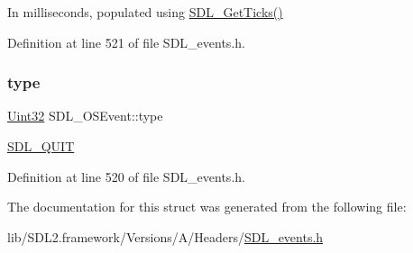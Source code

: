 In milliseconds, populated using \mbox{\hyperlink{_s_d_l__timer_8h_a0b9bc71d6287e0ffafdc3419760fe2b3}{S\+D\+L\+\_\+\+Get\+Ticks()}} 

Definition at line 521 of file S\+D\+L\+\_\+events.\+h.

\mbox{\label{struct_s_d_l___o_s_event_a85a600619ebebc8db007fc757b3895a5}} 
\subsubsection{\texorpdfstring{type}{type}}
{\footnotesize\ttfamily \mbox{\hyperlink{_s_d_l__stdinc_8h_add440eff171ea5f55cb00c4a9ab8672d}{Uint32}} S\+D\+L\+\_\+\+O\+S\+Event\+::type}

\mbox{\hyperlink{_s_d_l__events_8h_a3b589e89be6b35c02e0dd34a55f3fccaa31acc5fdafc86ebe2c1f5c3cae48d603}{S\+D\+L\+\_\+\+Q\+U\+IT}} 

Definition at line 520 of file S\+D\+L\+\_\+events.\+h.



The documentation for this struct was generated from the following file\+:\begin{DoxyCompactItemize}
\item 
lib/\+S\+D\+L2.\+framework/\+Versions/\+A/\+Headers/\mbox{\hyperlink{_s_d_l__events_8h}{S\+D\+L\+\_\+events.\+h}}\end{DoxyCompactItemize}
